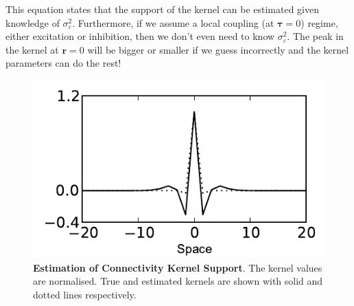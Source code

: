 \documentclass[]{article}
\begin{document}
 This equation states that the support of the kernel can be estimated given knowledge of $\sigma_\varepsilon^2$. Furthermore, if we assume a local coupling (at $\boldsymbol\tau=0$) regime, either excitation or inhibition, then we don't even need to know $\sigma_\varepsilon^2$. The peak in the kernel at $\mathbf{r}=0$ will be bigger or smaller if we guess incorrectly and the kernel parameters can do the rest! 
\begin{figure}[!ht]
\begin{center}
\includegraphics{./Figures/KernelWidthEstimation.pdf}
\end{center}
\caption{{\bf Estimation of Connectivity Kernel Support}. The kernel values are normalised. True  and estimated kernels are shown with solid and dotted lines respectively.}
\label{fig:KernelWidth}
\end{figure}
\newpage
\end{document}
